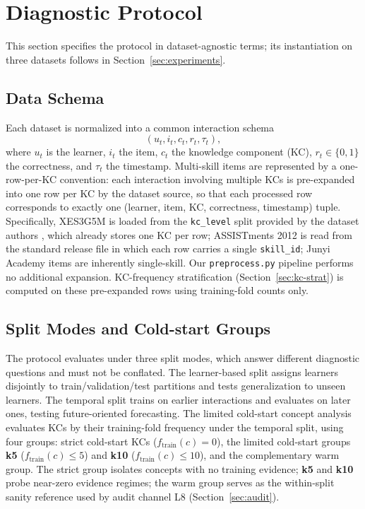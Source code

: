\section{Diagnostic Protocol}
\label{sec:protocol}

This section specifies the protocol in dataset-agnostic terms; its instantiation on three datasets follows in Section~\ref{sec:experiments}.

\subsection{Data Schema}
Each dataset is normalized into a common interaction schema
\begin{equation}
(u_t, i_t, c_t, r_t, \tau_t),
\end{equation}
where $u_t$ is the learner, $i_t$ the item, $c_t$ the knowledge component (KC), $r_t \in \{0,1\}$ the correctness, and $\tau_t$ the timestamp. Multi-skill items are represented by a one-row-per-KC convention: each interaction involving multiple KCs is pre-expanded into one row per KC by the dataset source, so that each processed row corresponds to exactly one (learner, item, KC, correctness, timestamp) tuple. Specifically, XES3G5M is loaded from the \texttt{kc\_level} split provided by the dataset authors \citep{liu2023xes3g5m}, which already stores one KC per row; ASSISTments 2012 \citep{assistments2012data} is read from the standard release file in which each row carries a single \texttt{skill\_id}; Junyi Academy \citep{junyi2019kaggle} items are inherently single-skill. Our \texttt{preprocess.py} pipeline performs no additional expansion. KC-frequency stratification (Section~\ref{sec:kc-strat}) is computed on these pre-expanded rows using training-fold counts only.

\subsection{Split Modes and Cold-start Groups}
The protocol evaluates under three split modes, which answer different diagnostic questions and must not be conflated. The learner-based split assigns learners disjointly to train/validation/test partitions and tests generalization to unseen learners. The temporal split trains on earlier interactions and evaluates on later ones, testing future-oriented forecasting. The limited cold-start concept analysis evaluates KCs by their training-fold frequency under the temporal split, using four groups: strict cold-start KCs ($f_{\mathrm{train}}(c) = 0$), the limited cold-start groups \textbf{k5} ($f_{\mathrm{train}}(c) \le 5$) and \textbf{k10} ($f_{\mathrm{train}}(c) \le 10$), and the complementary warm group. The strict group isolates concepts with no training evidence; \textbf{k5} and \textbf{k10} probe near-zero evidence regimes; the warm group serves as the within-split sanity reference used by audit channel L8 (Section~\ref{sec:audit}).

